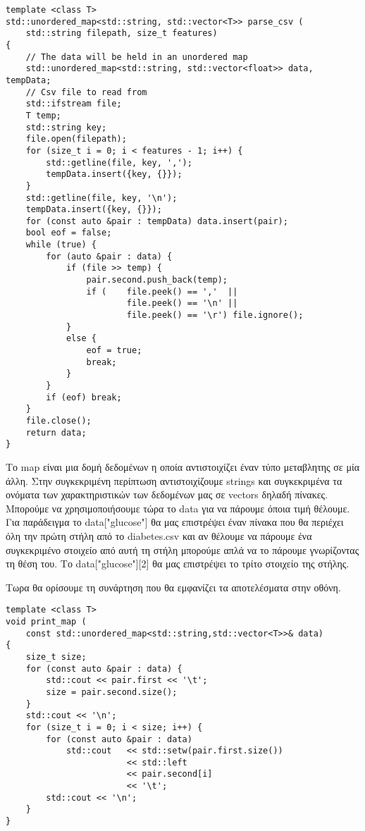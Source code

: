 \begin{otherlanguage}{english}
\begin{lstlisting}[style=cppstyle, caption = parse\_csv function]
template <class T>
std::unordered_map<std::string, std::vector<T>> parse_csv (
    std::string filepath, size_t features)
{
    // The data will be held in an unordered map
    std::unordered_map<std::string, std::vector<float>> data, tempData;
    // Csv file to read from
    std::ifstream file;
    T temp;
    std::string key;
    file.open(filepath);
    for (size_t i = 0; i < features - 1; i++) {
        std::getline(file, key, ',');
        tempData.insert({key, {}});
    }
    std::getline(file, key, '\n');
    tempData.insert({key, {}});
    for (const auto &pair : tempData) data.insert(pair);
    bool eof = false;
    while (true) {
        for (auto &pair : data) {
            if (file >> temp) {
                pair.second.push_back(temp);
                if (    file.peek() == ','  ||
                        file.peek() == '\n' ||
                        file.peek() == '\r') file.ignore();
            }
            else {
                eof = true;
                break;
            }
        }
        if (eof) break;
    }
    file.close();
    return data;
}
\end{lstlisting}
\end{otherlanguage}
\par Το \textlatin{map} είναι μια δομή δεδομένων η οποία αντιστοιχίζει έναν τύπο μεταβλητης σε μία άλλη. Στην συγκεκριμένη περίπτωση αντιστοιχίζουμε \textlatin{strings} και συγκεκριμένα τα ονόματα των χαρακτηριστικών των δεδομένων μας σε
\textlatin{vectors} δηλαδή πίνακες. Μπορούμε να χρησιμοποιήσουμε  τώρα το \textlatin{data} για να πάρουμε όποια τιμή θέλουμε. Για παράδειγμα το \textlatin{data["glucose"]} θα μας επιστρέψει έναν πίνακα που θα περιέχει όλη την πρώτη στήλη
από το \textlatin{diabetes.csv} και αν θέλουμε να πάρουμε ένα συγκεκριμένο στοιχείο από αυτή τη στήλη μπορούμε απλά να το πάρουμε γνωρίζοντας τη θέση του. Το \textlatin{data["glucose"][2]} θα μας επιστρέψει το τρίτο στοιχείο της στήλης.
\par Τωρα θα ορίσουμε τη συνάρτηση που θα εμφανίζει τα αποτελέσματα στην οθόνη.
\begin{otherlanguage}{english}
\begin{lstlisting}[style=cppstyle, caption = print\_map function]
template <class T>
void print_map (
    const std::unordered_map<std::string,std::vector<T>>& data)
{
    size_t size;
    for (const auto &pair : data) {
        std::cout << pair.first << '\t';
        size = pair.second.size();
    }
    std::cout << '\n';
    for (size_t i = 0; i < size; i++) {
        for (const auto &pair : data)
            std::cout   << std::setw(pair.first.size())
                        << std::left
                        << pair.second[i]
                        << '\t';
        std::cout << '\n';
    }
}
\end{lstlisting}
\end{otherlanguage}
